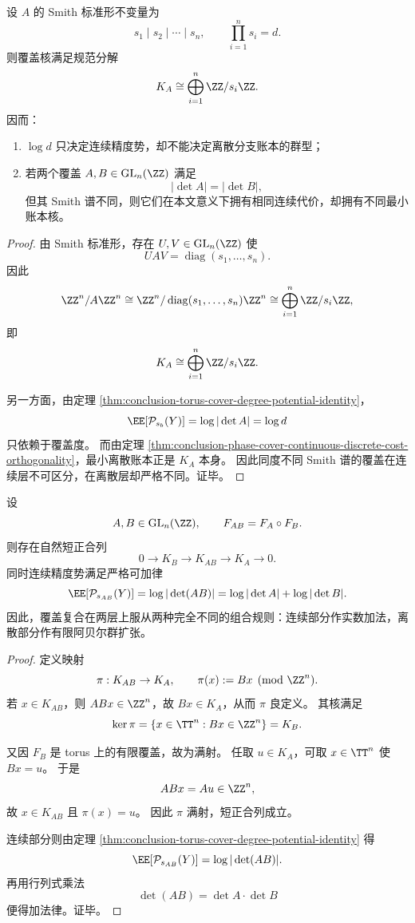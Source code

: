 \begin{theorem}\label{thm:conclusion-phase-cover-smith-spectrum-controls-branch-complexity}
设 \(A\) 的 Smith 标准形不变量为
\[
s_1\mid s_2\mid\cdots\mid s_n,
\qquad
\prod_{i=1}^{n}s_i=d.
\]
则覆盖核满足规范分解
\[
K_A\cong \bigoplus_{i=1}^{n}\ZZ/s_i\ZZ.
\]
因而：
\begin{enumerate}
  \item \(\log d\) 只决定连续精度势，却不能决定离散分支账本的群型；
  \item 若两个覆盖 \(A,B\in \mathrm{GL}_n(\ZZ)\) 满足
  \[
  |\det A|=|\det B|,
  \]
  但其 Smith 谱不同，则它们在本文意义下拥有相同连续代价，却拥有不同最小账本核。
\end{enumerate}
\end{theorem}
\begin{proof}
由 Smith 标准形，存在 \(U,V\in \mathrm{GL}_n(\ZZ)\) 使
\[
UAV=\operatorname{diag}(s_1,\dots,s_n).
\]
因此
\[
\ZZ^n/A\ZZ^n
\cong
\ZZ^n/\operatorname{diag}(s_1,\dots,s_n)\ZZ^n
\cong
\bigoplus_{i=1}^{n}\ZZ/s_i\ZZ,
\]
即
\[
K_A\cong \bigoplus_{i=1}^{n}\ZZ/s_i\ZZ.
\]

另一方面，由定理 \ref{thm:conclusion-torus-cover-degree-potential-identity}，
\[
\EE[\mathcal P_{s_b}(Y)]=\log|\det A|=\log d
\]
只依赖于覆盖度。
而由定理 \ref{thm:conclusion-phase-cover-continuous-discrete-cost-orthogonality}，最小离散账本正是 \(K_A\) 本身。
因此同度不同 Smith 谱的覆盖在连续层不可区分，在离散层却严格不同。证毕。
\end{proof}

\begin{theorem}[线性相位覆盖的复合律把连续精度与离散账本分别做加法与扩张]\label{thm:conclusion-phase-cover-composition-addition-extension-law}
设
\[
A,B\in \mathrm{GL}_n(\ZZ),
\qquad
F_{AB}=F_A\circ F_B.
\]
则存在自然短正合列
\[
0\longrightarrow K_B\longrightarrow K_{AB}\longrightarrow K_A\longrightarrow 0.
\]
同时连续精度势满足严格可加律
\[
\EE[\mathcal P_{s_{AB}}(Y)]
=
\log|\det(AB)|
=
\log|\det A|+\log|\det B|.
\]
因此，覆盖复合在两层上服从两种完全不同的组合规则：连续部分作实数加法，离散部分作有限阿贝尔群扩张。
\end{theorem}
\begin{proof}
定义映射
\[
\pi:K_{AB}\to K_A,
\qquad
\pi(x):=Bx\pmod{\ZZ^n}.
\]
若 \(x\in K_{AB}\)，则 \(ABx\in \ZZ^n\)，故 \(Bx\in K_A\)，从而 \(\pi\) 良定义。
其核满足
\[
\ker\pi
=
\{x\in \TT^n: Bx\in \ZZ^n\}
=
K_B.
\]

又因 \(F_B\) 是 torus 上的有限覆盖，故为满射。
任取 \(u\in K_A\)，可取 \(x\in \TT^n\) 使 \(Bx=u\)。
于是
\[
ABx=Au\in \ZZ^n,
\]
故 \(x\in K_{AB}\) 且 \(\pi(x)=u\)。
因此 \(\pi\) 满射，短正合列成立。

连续部分则由定理 \ref{thm:conclusion-torus-cover-degree-potential-identity} 得
\[
\EE[\mathcal P_{s_{AB}}(Y)]=\log|\det(AB)|.
\]
再用行列式乘法
\[
\det(AB)=\det A\cdot \det B
\]
便得加法律。证毕。
\end{proof}

